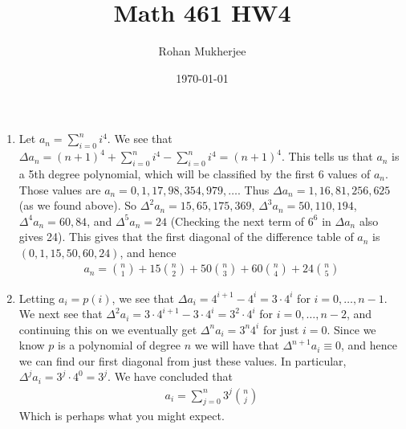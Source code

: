 \documentclass[12pt]{article}
\title{Math 461 HW4}
\date{\today}
\author{Rohan Mukherjee}
\theoremstyle{definition}
\theoremstyle{remark}
\begin{document}
	\maketitle
	\begin{enumerate}[leftmargin=\labelsep]
		\item Let $a_n = \sum_{i=0}^n i^4$. We see that $\Delta a_n = (n+1)^4 + \sum_{i=0}^n i^4 - \sum_{i=0}^n i^4 = (n+1)^4$. This tells us that $a_n$ is a 5th degree polynomial, which will be classified by the first 6 values of $a_n$. Those values are $a_n = 0, 1, 17, 98, 354, 979, \ldots$. Thus $\Delta a_n = 1, 16, 81, 256, 625$ (as we found above). So $\Delta^2 a_n = 15, 65, 175, 369$, $\Delta^3 a_n = 50, 110, 194$, $\Delta^4 a_n = 60, 84$, and $\Delta^5 a_n = 24$ (Checking the next term of $6^6$ in $\Delta a_n$ also gives 24). This gives that the first diagonal of the difference table of $a_n$ is $(0, 1, 15, 50, 60, 24)$, and hence 
		\begin{align*}
			a_n = {n \choose 1} + 15{n \choose 2} + 50{n \choose 3} + 60{n \choose 4} + 24{n \choose 5}
		\end{align*}
	
		\item Letting $a_i = p(i)$, we see that $\Delta a_i = 4^{i+1}-4^{i} = 3 \cdot 4^i$ for $i = 0, \ldots, n-1$. We next see that $\Delta^2 a_i = 3 \cdot 4^{i+1} - 3\cdot 4^i = 3^2 \cdot 4^i$ for $i = 0, \ldots, n-2$, and continuing this on we eventually get $\Delta^n a_i = 3^n 4^i$ for just $i = 0$. Since we know $p$ is a polynomial of degree $n$ we will have that $\Delta^{n+1} a_i \equiv 0$, and hence we can find our first diagonal from just these values. In particular, $\Delta^j a_i = 3^j \cdot 4^0 = 3^j$. We have concluded that
		\begin{align*}
			a_i = \sum_{j=0}^n 3^j {n \choose j}
		\end{align*}
		Which is perhaps what you might expect.
		

\end{enumerate}
\end{document}
